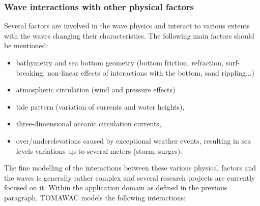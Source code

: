 \subsubsection{Wave interactions with other physical factors}
Several factors are involved in the wave physics and interact to various extents with the waves changing their characteristics. The following main factors should be mentioned:
\begin{itemize}
\item bathymetry and sea bottom geometry (bottom friction, refraction, surf-breaking, non-linear effects of interactions with the bottom, sand rippling...)
\item atmospheric circulation (wind and pressure effects)
\item tide pattern (variation of currents and water heights),
\item three-dimensional oceanic circulation currents,
\item over/underelevations caused by exceptional weather events, resulting in sea levels variations up to several meters (storm, surges).
\end{itemize}
The fine modelling of the interactions between these various physical factors and the waves is generally rather complex and several research projects are currently focused on it. Within the application domain as defined in the previous paragraph, TOMAWAC models the following interactions:
